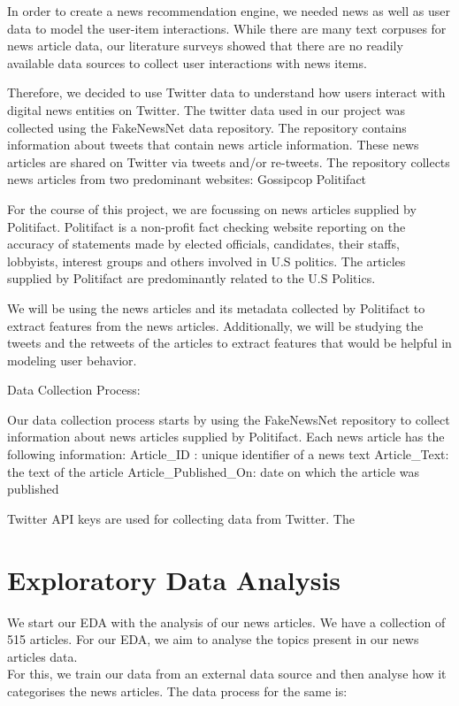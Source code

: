 \documentclass{article}
\begin{document}
In order to create a news recommendation engine, we needed news as well as user data to model the user-item interactions. While there are many text corpuses for news article data, our literature surveys showed that there are no readily available data sources to collect user interactions with news items. 

Therefore, we decided to use Twitter data to understand how users interact with digital news entities on Twitter. 
The twitter data used in our project was collected using the FakeNewsNet data repository. The repository contains information about tweets that contain news article information. These news articles are shared on Twitter via tweets and/or re-tweets. The repository collects news articles from two predominant websites:
Gossipcop
Politifact

For the course of this project, we are focussing on news articles supplied by Politifact. Politifact is a non-profit fact checking website reporting on the accuracy of statements made by elected officials, candidates, their staffs, lobbyists, interest groups and others involved in U.S politics. The articles supplied by Politifact are predominantly related to the U.S Politics. 

We will be using the news articles and its metadata collected by Politifact to extract features from the news articles. Additionally, we will be studying the tweets and the retweets of the articles to extract features that would be helpful in modeling user behavior. 

Data Collection Process:

Our data collection process starts by using the FakeNewsNet repository to collect information about news articles supplied by Politifact. 
Each news article has the following information:
Article_ID : unique identifier of a news text
Article_Text: the text of the article
Article_Published_On: date on which the article was published

Twitter API keys are used for collecting data from Twitter. The 

\section{Exploratory Data Analysis}

We start our EDA with the analysis of our news articles. We have a collection of 515 articles. For our EDA, we aim to analyse the topics present in our news articles data. \\
 For this, we train our data from an external data source and then analyse how it categorises the news articles. The data process for the same is: \\
\end{document}
